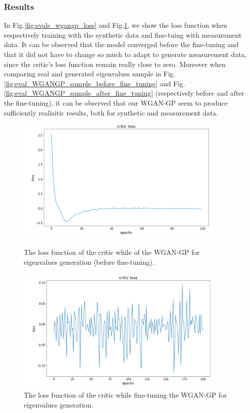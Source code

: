\documentclass{article}
\begin{document}
\subsubsection{Results}

In Fig.\ref{fig:evals_wgangp_loss} and Fig.\ref{fig:evals_loss_after_finetuning}, we show the loss function when respectively training with the synthetic data and fine-tuing with measurement data. It can be observed that the model converged before the fine-tuning and that it did not have to change so much to adapt to generate measurement data, since the critic's loss function remain really close to zero. Moreover when comparing real  and generated eigenvalues sample in Fig.\ref{fig:eval_WGANGP_sample_before_fine_tuning} and Fig.\ref{fig:eval_WGANGP_sample_after_fine_tuning} (respectively before and after the fine-tuning), it can be observed that our WGAN-GP seem to produce sufficiently realisitic results, both for synthetic and measurement data.

\begin{figure}
    \centering
    \begin{minipage}{0.45\textwidth}
        \includegraphics[width=0.9\textwidth]{../figs/evals_wgangp_loss.png}    
    \caption{The loss function of the critic while  of the WGAN-GP for eigenvalues generation (before fine-tuning).}
    \label{fig:evals_wgangp_loss}
    \end{minipage}\hfill
    \begin{minipage}{0.45\textwidth}
        \includegraphics[width=0.9\textwidth]{../figs/evals_loss_after_finetuning.png}    
    \caption{The loss function of the critic while fine-tuning the WGAN-GP for eigenvalues generation.}
    \label{fig:evals_loss_after_finetuning}
    \end{minipage}
\end{figure}
\end{document}

